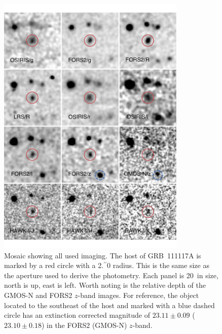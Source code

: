\documentclass[longauth]{aa}    %
\newcommand{\farc}{\hbox{$.\!\!^{\prime\prime}$}}
\begin{document}
\begin{figure}
      \centering \includegraphics[width=9cm]{figures/photometry_mosaic.pdf}
\caption{Mosaic showing all used imaging. The host of GRB~111117A is marked by
        a red circle with a 2\farc0 radius. This is the same size as the aperture used
        to derive the photometry. Each panel is 20\arcsec~in size, north is up, east
        is left. Worth noting is the relative depth of the GMOS-N and FORS2 $z$-band
        images. For reference, the object located to the southeast of the host and
        marked with a blue dashed circle has an extinction corrected magnitude of
        $23.11 \pm 0.09$ ($23.10 \pm 0.18$) in the FORS2 (GMOS-N) $z$-band.}
\label{fig:photplot}
\end{figure}
\end{document}
